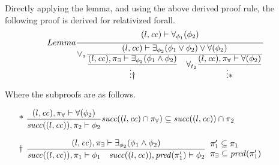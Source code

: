 \documentclass{article}
\newcommand{\proofrule}[3][]{#1 \frac{\raisebox{.7ex}{\normalsize{$#2$}}}
  {\raisebox{-1.0ex}{\normalsize{$#3$}}}}
\newcommand{\placeholder}[1][]{\pi_{#1}}
\newcommand{\loc}{l}
\newcommand{\region}{\mathit{cc}}
\newcommand{\suc}{\mathit{succ}}
\newcommand{\pre}{\mathit{pred}}
\begin{document}
Directly applying the lemma, and using the above derived proof rule,
the following proof is derived for relativized forall.
\[
\proofrule[Lemma]
{(\loc, \region) \vdash \forall_{\phi_1}(\phi_2)
}
{\proofrule[\lor_s]
  {(\loc, \region) \vdash \exists_{\phi_2}(\phi_1 \lor \phi_2) \lor \forall(\phi_2)}
  { \proofrule
    {(\loc, \region), \placeholder[\exists] \vdash \exists_{\phi_2}(\phi_1 \land \phi_2)}
    {\vdots \dagger}
  \quad
    \proofrule[\forall_{t_2}] 
    {(\loc, \region), \placeholder[\forall] \vdash \forall(\phi_2)}
    {\vdots *}
  }
}
\]

Where the subproofs are as follows.
\begin{itemize}
  \item[$*$] $
  \proofrule
   {(\loc, \region), \placeholder[\forall] \vdash \forall(\phi_2)}
   {\suc((\loc, \region)), \placeholder[2] \vdash \phi_2}
   \suc((\loc, \region) \cap \placeholder[\forall]) \subseteq \suc((\loc, \region)) \cap \placeholder[2]
  $
  \item[$\dagger$]
  $
  \proofrule
  {(\loc, \region), \placeholder[\exists] \vdash \exists_{\phi_2}(\phi_1 \land \phi_2)}
  {\suc((\loc, \region)), \placeholder[1] \vdash \phi_1
      \quad \suc((\loc, \region)), \pre(\placeholder[1]') \vdash \phi_2}
  \begin{array}{l}
  \placeholder[1]' \subseteq \placeholder[1]\\
  \placeholder[\exists] \subseteq \pre(\placeholder[1]')
  \end{array}
  $
\end{itemize}
\end{document}
